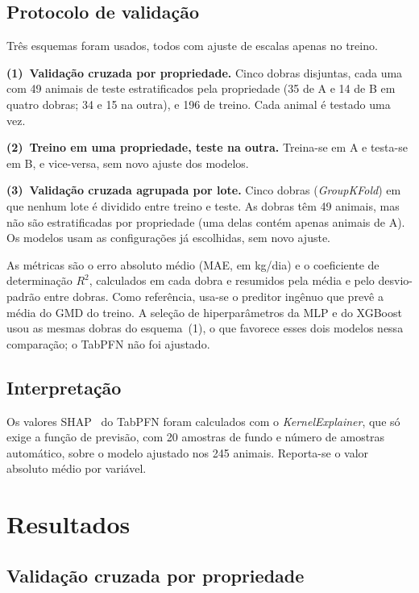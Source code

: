 \documentclass[conference]{IEEEtran}
\begin{document}
\subsection{Protocolo de validação}

Três esquemas foram usados, todos com ajuste de escalas apenas no treino.

\textbf{(1)~Validação cruzada por propriedade.} Cinco dobras disjuntas, cada uma com 49 animais de teste estratificados pela propriedade (35 de A e 14 de B em quatro dobras; 34 e 15 na outra), e 196 de treino. Cada animal é testado uma vez.

\textbf{(2)~Treino em uma propriedade, teste na outra.} Treina-se em A e testa-se em B, e vice-versa, sem novo ajuste dos modelos.

\textbf{(3)~Validação cruzada agrupada por lote.} Cinco dobras (\textit{GroupKFold}) em que nenhum lote é dividido entre treino e teste. As dobras têm 49 animais, mas não são estratificadas por propriedade (uma delas contém apenas animais de A). Os modelos usam as configurações já escolhidas, sem novo ajuste.

As métricas são o erro absoluto médio (MAE, em kg/dia) e o coeficiente de determinação $R^2$, calculados em cada dobra e resumidos pela média e pelo desvio-padrão entre dobras. Como referência, usa-se o preditor ingênuo que prevê a média do GMD do treino. A seleção de hiperparâmetros da MLP e do XGBoost usou as mesmas dobras do esquema~(1), o que favorece esses dois modelos nessa comparação; o TabPFN não foi ajustado.

\subsection{Interpretação}

Os valores SHAP~\cite{lundberg2017shap} do TabPFN foram calculados com o \textit{KernelExplainer}, que só exige a função de previsão, com 20 amostras de fundo e número de amostras automático, sobre o modelo ajustado nos 245 animais. Reporta-se o valor absoluto médio por variável.

\section{Resultados}\label{sec:res}

\subsection{Validação cruzada por propriedade}
\end{document}
